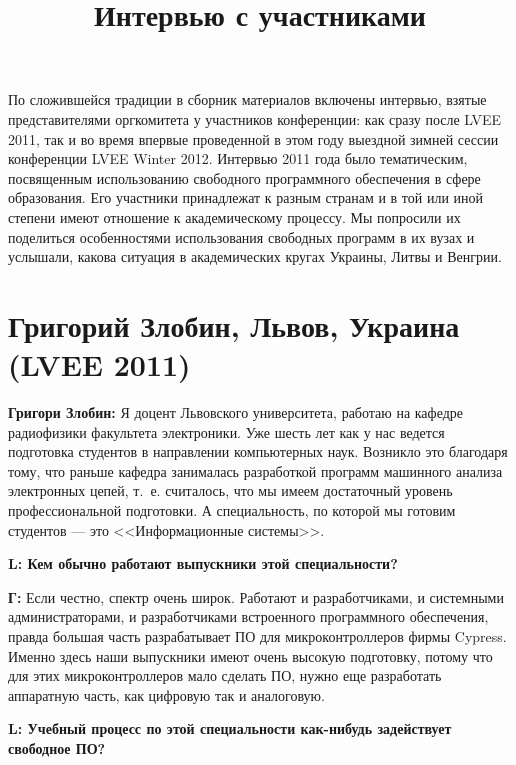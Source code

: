 \documentclass[10pt, a5paper]{article}
\begin{document}
\title{Интервью с участниками}
\date{}
\maketitle

По сложившейся традиции в сборник материалов включены интервью, взятые представителями оргкомитета у участников конференции: как сразу после LVEE 2011, так и во время впервые проведенной в этом году выездной зимней сессии конференции LVEE Winter 2012. Интервью 2011 года было тематическим, посвященным использованию свободного программного обеспечения в сфере образования. Его участники принадлежат к разным странам и в той или иной степени имеют отношение к академическому процессу. Мы попросили их поделиться особенностями использования свободных программ в их вузах и услышали, какова ситуация в академических кругах Украины, Литвы и Венгрии.

\section[Григорий Злобин, Львов, Украина (LVEE 2011)]{Григорий Злобин, Львов, Украина \linebreak (LVEE 2011)}

{\noindent \bf Григори Злобин:} Я доцент Львовского университета, работаю на кафедре радиофизики факультета электроники. Уже шесть лет как у нас ведется подготовка студентов в направлении компьютерных наук. Возникло это благодаря тому, что раньше кафедра занималась разработкой программ машинного анализа электронных цепей, т.~е. считалось, что мы имеем достаточный уровень профессиональной подготовки. А специальность, по которой мы готовим студентов --- это <<Информационные системы>>.

{\noindent \bf L: Кем обычно работают выпускники этой специальности?}

{\noindent \bf Г:} Если честно, спектр очень широк. Работают и разработчиками, и системными администраторами, и разработчиками встроенного программного обеспечения, правда большая часть разрабатывает ПО для микроконтроллеров фирмы Cypress. Именно здесь наши выпускники имеют очень высокую подготовку, потому что для этих микроконтроллеров мало сделать ПО, нужно еще разработать аппаратную часть, как цифровую так и аналоговую. 

{\noindent \bf L: Учебный процесс по этой специальности как-нибудь задействует свободное ПО?}
\end{document}
